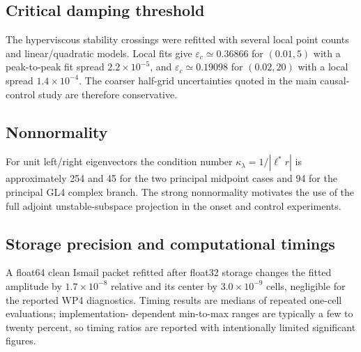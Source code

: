 \subsection{Critical damping threshold}
The hyperviscous stability crossings were refitted with several local point
counts and linear/quadratic models.  Local fits give
$\varepsilon_c\simeq0.36866$ for $(0.01,5)$ with a peak-to-peak fit spread
$2.2\times10^{-5}$, and $\varepsilon_c\simeq0.19098$ for $(0.02,20)$ with a
local spread $1.4\times10^{-4}$.  The coarser half-grid uncertainties quoted
in the main causal-control study are therefore conservative.

\subsection{Nonnormality}
For unit left/right eigenvectors the condition number
$\kappa_\lambda=1/|\ell^*r|$ is approximately 254 and 45 for the two principal
midpoint cases and 94 for the principal GL4 complex branch.  The strong
nonnormality motivates the use of the full adjoint unstable-subspace
projection in the onset and control experiments.

\subsection{Storage precision and computational timings}
A float64 clean Ismail packet refitted after float32 storage changes the fitted
amplitude by $1.7\times10^{-8}$ relative and its center by
$3.0\times10^{-9}$ cells, negligible for the reported WP4 diagnostics.
Timing results are medians of repeated one-cell evaluations; implementation-
dependent min-to-max ranges are typically a few to twenty percent, so timing
ratios are reported with intentionally limited significant figures.
